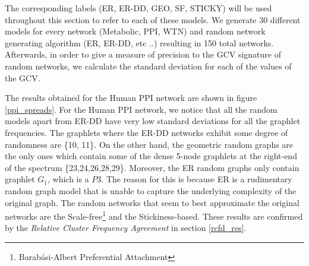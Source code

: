 The corresponding labels (ER, ER-DD, GEO, SF, STICKY) will be used throughout this section to refer to each of these models. We generate 30 different models for every network (Metabolic, PPI, WTN) and random network generating algorithm (ER, ER-DD, etc ..) resulting in 150 total networks. Afterwards, in order to give a measure of precision to the GCV signature of random networks, we calculate the standard deviation for each of the values of the GCV. 

The results obtained for the Human PPI network are shown in figure \ref{ppi_spreads}. For the Human PPI network, we notice that all the random models apart from ER-DD have very low standard deviations for all the graphlet frequencies. The graphlets where the ER-DD networks exhibit some degree of randomness are \{10, 11\}. On the other hand, the geometric random graphs are the only ones which contain some of the dense 5-node graphlets at the right-end of the spectrum \{23,24,26,28,29\}. Moreover, the ER random graphs only contain graphlet $G_1$, which is a $P3$. The reason for this is because ER is a rudimentary random graph model that is unable to capture the underlying complexity of the original graph. The random networks that seem to best approximate the original networks are the Scale-free\footnote{Barab\'{a}si-Albert Preferential Attachment} and the Stickiness-based. These results are confirmed by the \emph{Relative Cluster Frequency Agreement} in section \ref{rcfd_res}.


